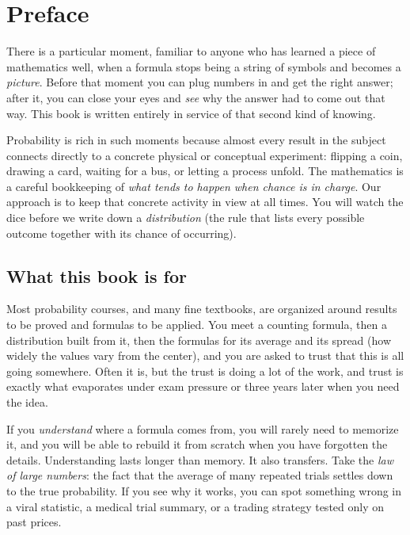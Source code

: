 \chapter*{Preface}

There is a particular moment, familiar to anyone who has learned a piece
of mathematics well, when a formula stops being a string of symbols and becomes a
\emph{picture}. Before that moment you can plug numbers in and get the right
answer; after it, you can close your eyes and \emph{see} why the answer had to
come out that way. This book is written entirely in service of that second kind
of knowing.

Probability is rich in such moments because almost every result in the
subject connects directly to a concrete physical or conceptual experiment:
flipping a coin, drawing a card, waiting for a bus, or letting a process unfold.
The mathematics is a careful bookkeeping of \emph{what tends to happen when chance is in charge}. Our
approach is to keep that concrete activity in view at all times. You will watch
the dice before we write down a \emph{distribution} (the rule that lists every
possible outcome together with its chance of occurring).

\section*{What this book is for}
\label{ch00:what-for}

Most probability courses, and many fine textbooks, are organized around results
to be proved and formulas to be applied. You meet a counting formula, then a
distribution built from it, then the formulas for its average and its spread
(how widely the values vary from the center),
and you are asked to trust that this is all going somewhere. Often it is, but
the trust is doing a lot of the work, and trust is exactly what evaporates under
exam pressure or three years later when you need the idea.

If you
\emph{understand} where a formula comes from, you will rarely need to memorize
it, and you will be able to rebuild it from scratch when you have forgotten the
details. Understanding lasts
longer than memory. It also transfers. Take the \emph{law of large numbers}:
the fact that the average of many repeated trials settles down to the true
probability. If you see why it works, you can spot something wrong in a viral statistic,
a medical trial summary, or a trading strategy tested only on past prices.

